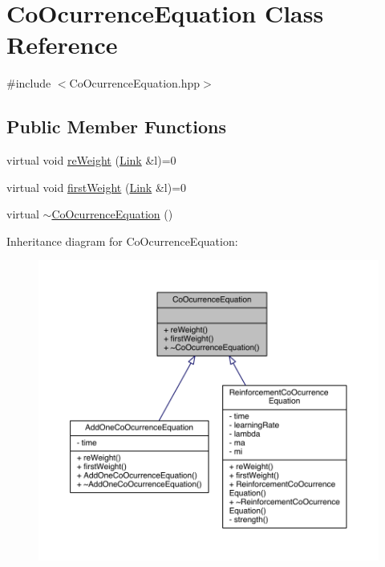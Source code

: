 \hypertarget{class_co_ocurrence_equation}{\section{Co\+Ocurrence\+Equation Class Reference}
\label{class_co_ocurrence_equation}
}


{\ttfamily \#include $<$Co\+Ocurrence\+Equation.\+hpp$>$}

\subsection*{Public Member Functions}
\begin{DoxyCompactItemize}
\item 
virtual void \hyperlink{class_co_ocurrence_equation_a9e274e5677044b1d9deb8d5ce649eea3}{re\+Weight} (\hyperlink{class_link}{Link} \&l)=0
\item 
virtual void \hyperlink{class_co_ocurrence_equation_adeb923a945b5e070d226003f1e247dc1}{first\+Weight} (\hyperlink{class_link}{Link} \&l)=0
\item 
virtual \hyperlink{class_co_ocurrence_equation_ad53d8d12bae18f7993f6e0770190f18e}{$\sim$\+Co\+Ocurrence\+Equation} ()
\end{DoxyCompactItemize}


Inheritance diagram for Co\+Ocurrence\+Equation\+:
\nopagebreak
\begin{figure}[H]
\begin{center}
\leavevmode
\includegraphics[width=350pt]{class_co_ocurrence_equation__inherit__graph}
\end{center}
\end{figure}


